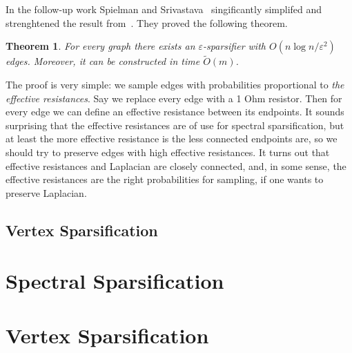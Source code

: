 \documentclass[12pt]{article}
\newcommand{\eps}{\varepsilon}
\newtheorem{theorem}{Theorem}
\begin{document}
    In the follow-up work Spielman and Srivastava~\cite{SS11} singificantly simplifed
    and strenghtened the result from~\cite{ST11}.
    They proved the following theorem.
    \begin{theorem}
        For every graph there exists an $\eps$-sparsifier with $O(n \log n / \eps^2)$
        edges. Moreover, it can be constructed in time $\tilde{O}(m)$.
    \end{theorem}
    The proof is very simple: we sample edges with probabilities proportional to
    \emph{the effective resistances}. Say we replace every edge with a 1 Ohm resistor.
    Then for every edge we can define an effective resistance between its endpoints.
    It sounds surprising that the effective resistances are of use for spectral
    sparsification, but at least the more effective resistance is the less connected
    endpoints are, so we should try to preserve edges with high effective resistances.
    It turns out that effective resistances and Laplacian are closely connected, and,
    in some sense, the effective resistances are the right probabilities for sampling,
    if one wants to preserve Laplacian.
    \subsection{Vertex Sparsification}
    \section{Spectral Sparsification}
    \section{Vertex Sparsification}
    
    
\end{document}
